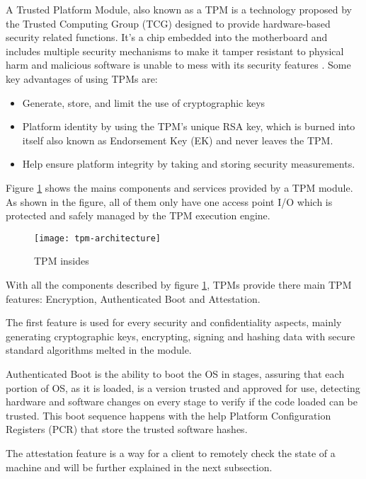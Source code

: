 A Trusted Platform Module, also known as a \gls{TPM} is a technology proposed by the Trusted Computing Group (\gls{TCG}) designed to provide hardware-based security related functions. It's a chip embedded into the motherboard and includes multiple security mechanisms to make it tamper resistant to physical harm and malicious software is unable to mess with its security features \cite{tpm:1}. Some key advantages of using \gls{TPM}s are:

\begin{itemize}
	\item Generate, store, and limit the use of cryptographic keys
	\item Platform identity by using the TPM’s unique RSA key, which is burned into itself also known as Endorsement Key (\gls{EK}) and never leaves the \gls{TPM}.
	\item Help ensure platform integrity by taking and storing security measurements.
\end{itemize}

Figure \ref{fig:tpm_architecture} shows the mains components and services provided by a \gls{TPM} module. As shown in the figure, all of them only have one access point \gls{I/O} which is protected and safely managed by the \gls{TPM} execution engine.

\begin{figure}[htbp]
	\centering
	{\texttt{[image: tpm-architecture]}}%
	\caption{TPM insides}
	\label{fig:tpm_architecture}
\end{figure}


With all the components described by figure \ref{fig:tpm_architecture}, \gls{TPM}s provide there main \gls{TPM} features: Encryption, Authenticated Boot and Attestation. 

The first feature is used for every security and confidentiality aspects, mainly generating cryptographic keys, encrypting, signing and hashing data with secure standard algorithms melted in the module.

Authenticated Boot is the ability to boot the \gls{OS} in stages, assuring that each portion of OS, as it is loaded, is a version trusted and approved for use, detecting hardware and software changes on every stage to verify if the code loaded can be trusted. This boot sequence happens with the help Platform Configuration Registers (\gls{PCR}) that store the trusted software hashes.

The attestation feature is a way for a client to remotely check the state of a machine and will be further explained in the next subsection.


